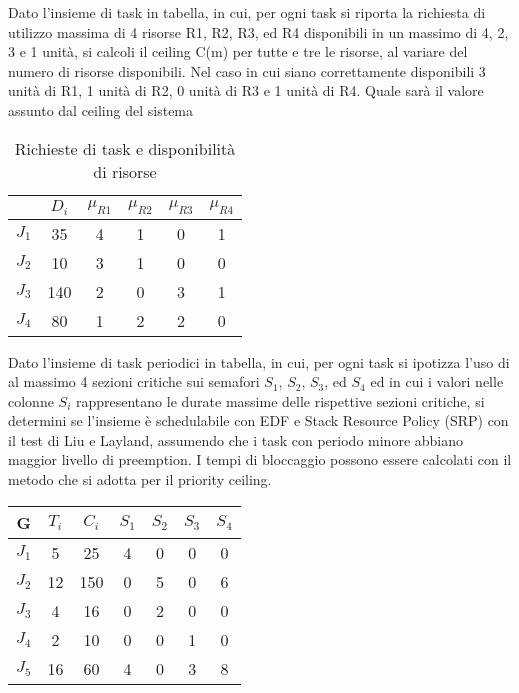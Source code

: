 \begin{Esercizio3}

Dato l'insieme di task in tabella, in cui, 
per ogni task si riporta la richiesta
 di utilizzo massima di 4 risorse R1, R2, R3, ed 
 R4 disponibili in un massimo di 4, 2, 3 e 1 unità, 
 si calcoli il ceiling C(m) per tutte e tre le risorse, 
 al variare del numero di risorse disponibili. 
 Nel caso in cui siano correttamente disponibili 3
  unità di R1, 1 unità di R2, 0 unità di R3 e 1 
  unità di R4. Quale sarà il valore assunto dal 
  ceiling del sistema 

  \begin{table}[h]
\centering
\begin{tabular}{|c|c|c|c|c|c|}
\hline
& $D_i$ & $\mu_{R1}$ & $\mu_{R2}$ & $\mu_{R3}$ & $\mu_{R4}$ \\
\hline
$J_1$ & 35 & 4 & 1 & 0 & 1 \\
\hline
$J_2$ & 10 & 3 & 1 & 0 & 0 \\
\hline
$J_3$ & 140 & 2 & 0 & 3 & 1 \\
\hline
$J_4$ & 80 & 1 & 2 & 2 & 0 \\
\hline
\end{tabular}
\caption{Richieste di task e disponibilità di risorse}
\end{table}

\end{Esercizio3}


\begin{Esercizio4}

Dato l'insieme di task periodici in tabella, in cui, per ogni task si ipotizza 
l'uso di al massimo 4 sezioni critiche sui semafori $S_1$, $S_2$, $S_3$, ed $S_4$ 
ed in cui i valori nelle colonne $S_i$ rappresentano le durate massime delle 
rispettive sezioni critiche, si determini se l'insieme è schedulabile con EDF 
e Stack Resource Policy (SRP) con il test di Liu e Layland, assumendo che i task 
con periodo minore abbiano maggior livello di preemption. I tempi di bloccaggio 
possono essere calcolati con il metodo che si adotta per il priority ceiling.

\begin{table}[h]
\centering
\begin{tabular}{|c|c|c|c|c|c|c|}
\hline
G & $T_i$ & $C_i$ & $S_1$ & $S_2$ & $S_3$ & $S_4$ \\
\hline
$J_1$ & 5 & 25 & 4 & 0 & 0 & 0 \\
\hline
$J_2$ & 12 & 150 & 0 & 5 & 0 & 6 \\
\hline
$J_3$ & 4 & 16 & 0 & 2 & 0 & 0 \\
\hline
$J_4$ & 2 & 10 & 0 & 0 & 1 & 0 \\
\hline
$J_5$ & 16 & 60 & 4 & 0 & 3 & 8 \\
\hline
\end{tabular}
\label{tab:task_esercizio3}
\end{table}


\end{Esercizio4}



